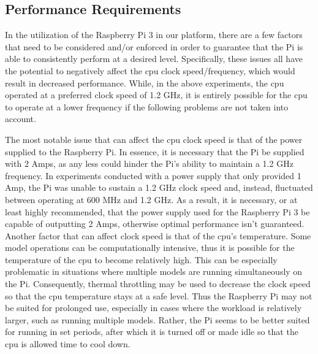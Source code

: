 
\subsection{Performance Requirements}
In the utilization of the Raspberry Pi 3 in our platform, there are a
few factors that need to be considered and/or enforced in order to
guarantee that the Pi is able to consistently perform at a desired
level. Specifically, these issues all have the potential to negatively
affect the cpu clock speed/frequency, which would result in decreased
performance. While, in the above experiments, the cpu operated at a
preferred clock speed of 1.2 GHz, it is entirely possible for the cpu
to operate at a lower frequency if the following problems are not
taken into account. 

The most notable issue that can affect the cpu clock speed is that of
the power supplied to the Raspberry Pi. In essence, it is necessary
that the Pi be supplied with 2 Amps, as any less could hinder the Pi's
ability to maintain a 1.2 GHz frequency. In experiments conducted with
a power supply that only provided 1 Amp, the Pi was unable to sustain
a 1.2 GHz clock speed and, instead, fluctuated between operating at
600 MHz and 1.2 GHz. As a result, it is necessary, or at least highly
recommended, that the power supply used for the Raspberry Pi 3 be
capable of outputting 2 Amps, otherwise optimal performance isn't
guaranteed.  Another factor that can affect clock speed is that of the
cpu's temperature. Some model operations can be computationally
intensive, thus it is possible for the temperature of the cpu to
become relatively high. This can be especially problematic in
situations where multiple models are running  simultaneously on the
Pi. Consequently, thermal throttling may be used to decrease the clock
speed so that the cpu temperature stays at a safe level. Thus the
Raspberry Pi may not be suited for prolonged use, especially in cases
where the workload is relatively larger, such as running multiple
models. Rather, the Pi seems to be better suited for running in set
periods, after which it is turned  off or made idle so that the cpu is
allowed time to cool down. 

